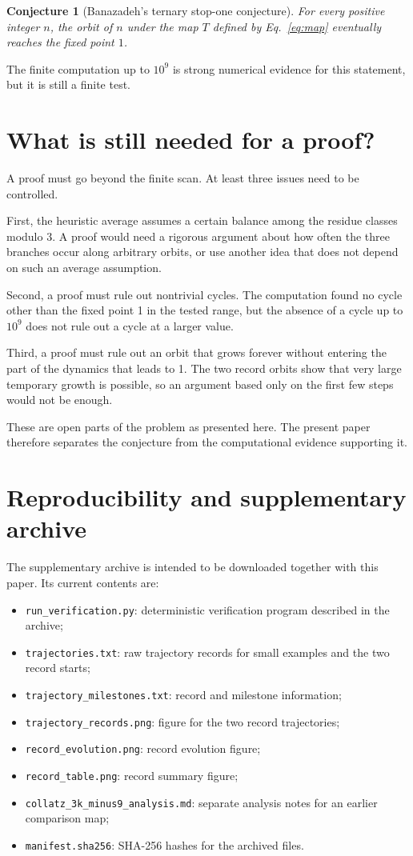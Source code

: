 \documentclass[11pt]{article}
\newtheorem{conjecture}{Conjecture}
\begin{document}
\begin{conjecture}[Banazadeh's ternary stop-one conjecture]
For every positive integer $n$, the orbit of $n$ under the map $T$ defined by Eq.~\eqref{eq:map} eventually reaches the fixed point $1$.
\end{conjecture}

The finite computation up to $10^9$ is strong numerical evidence for this statement, but it is still a finite test.

\section{What is still needed for a proof?}
A proof must go beyond the finite scan. At least three issues need to be controlled.

First, the heuristic average assumes a certain balance among the residue classes modulo 3. A proof would need a rigorous argument about how often the three branches occur along arbitrary orbits, or use another idea that does not depend on such an average assumption.

Second, a proof must rule out nontrivial cycles. The computation found no cycle other than the fixed point 1 in the tested range, but the absence of a cycle up to $10^9$ does not rule out a cycle at a larger value.

Third, a proof must rule out an orbit that grows forever without entering the part of the dynamics that leads to 1. The two record orbits show that very large temporary growth is possible, so an argument based only on the first few steps would not be enough.

These are open parts of the problem as presented here. The present paper therefore separates the conjecture from the computational evidence supporting it.

\section{Reproducibility and supplementary archive}
The supplementary archive is intended to be downloaded together with this paper. Its current contents are:
\begin{itemize}[leftmargin=1.5em]
\item \texttt{run\_verification.py}: deterministic verification program described in the archive;
\item \texttt{trajectories.txt}: raw trajectory records for small examples and the two record starts;
\item \texttt{trajectory\_milestones.txt}: record and milestone information;
\item \texttt{trajectory\_records.png}: figure for the two record trajectories;
\item \texttt{record\_evolution.png}: record evolution figure;
\item \texttt{record\_table.png}: record summary figure;
\item \texttt{collatz\_3k\_minus9\_analysis.md}: separate analysis notes for an earlier comparison map;
\item \texttt{manifest.sha256}: SHA-256 hashes for the archived files.
\end{itemize}
\end{document}
